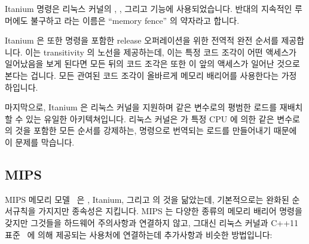 Itanium  명령은 리눅스 커널의 , , 그리고
 기능에 사용되었습니다.
반대의 지속적인 루머에도 불구하고  라는 이름은 ``memory fence'' 의
약자라고 합니다.

Itanium 은 또한  명령을 포함한 release 오퍼레이션을 위한 전역적 완전
순서를 제공합니다.
이는 transitivity 의 노선을 제공하는데, 이는 특정 코드 조각이 어떤 액세스가
일어났음을 보게 된다면 모든 뒤의 코드 조각은 또한 이 앞의 액세스가 일어난
것으로 본다는 겁니다.
모든 관여된 코드 조각이 올바르게 메모리 배리어를 사용한다는 가정 하입니다.

마지막으로, Itanium 은 리눅스 커널을 지원하며 같은 변수로의 평범한 로드를
재배치 할 수 있는 유일한 아키텍쳐입니다.
리눅스 커널은  가 특정 CPU 에 의한 같은 변수로의 것을 포함한
모든  순서를 강제하는,  명령으로 번역되는
 로드를 만들어내기 때문에 이 문제를 막습니다.

\subsection{MIPS}

MIPS 메모리 모델~\cite[page~479]{MIPSvII-A-2016} 은 \ARM, Itanium, 그리고
\Power{} 의 것을 닮았는데, 기본적으로는 완화된 순서규칙을 가지지만 종속성은
지킵니다.
MIPS 는 다양한 종류의 메모리 배리어 명령을 갖지만 그것들을 하드웨어 주의사항과
연결하지 않고, 그대신 리눅스 커널과 C++11 표준~\cite{RichardSmith2019N4800} 에
의해 제공되는 사용처에 연결하는데  추가사항과 비슷한 방법입니다:

